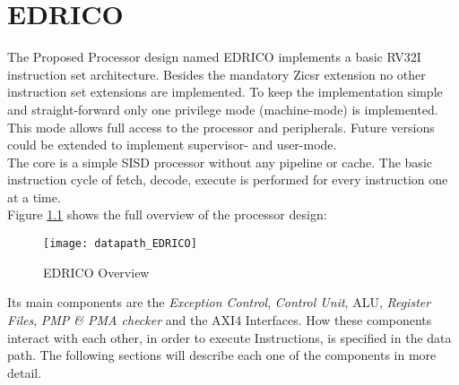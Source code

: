 
\chapter{EDRICO}
\label{chapter:edrico}
The Proposed Processor design named \acf{EDRICO} implements a basic \ac{RV32I}
instruction set architecture. Besides the mandatory Zicsr extension no other instruction set extensions are implemented. To keep the implementation simple and
straight-forward only one privilege mode (machine-mode) is implemented. This mode
allows full access to the processor and peripherals. Future versions could be
extended to implement supervisor- and user-mode.\\
The core is a simple \acf{SISD} processor without any pipeline or cache. The basic instruction cycle of fetch, decode, execute is performed for every instruction one at a time.\\
Figure \ref{fig:edricooverview} shows the full overview of the processor design:

\begin{figure}[H]
	\centering
	\texttt{[image: datapath\_EDRICO]}
	\caption{EDRICO Overview}
	\label{fig:edricooverview}
\end{figure}

Its main components are the \textit{Exception Control}, \textit{Control Unit}, \ac{ALU},
\textit{Register Files}, \textit{PMP \& PMA checker} and the \ac{AXI}4 Interfaces. How these components interact with each other, in order to execute Instructions, is specified in the data path.
The following sections will describe each one of the components in more detail.

